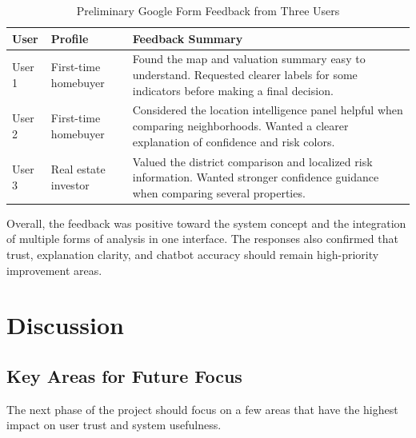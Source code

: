 \begin{table}[htbp]
    \centering
    \renewcommand{\arraystretch}{1.25}
    \begin{tabularx}{\textwidth}{>{\raggedright\arraybackslash}p{}>{\raggedright\arraybackslash}p{}>{\raggedright\arraybackslash}X}
        \toprule
        \rowcolor[gray]{0.9} \textbf{User} & \textbf{Profile} & \textbf{Feedback Summary} \\
        \midrule
        User 1 & First-time homebuyer & Found the map and valuation summary easy to understand. Requested clearer labels for some indicators before making a final decision. \\
        User 2 & First-time homebuyer & Considered the location intelligence panel helpful when comparing neighborhoods. Wanted a clearer explanation of confidence and risk colors. \\
        User 3 & Real estate investor & Valued the district comparison and localized risk information. Wanted stronger confidence guidance when comparing several properties. \\
        \bottomrule
    \end{tabularx}
    \caption{Preliminary Google Form Feedback from Three Users}
    \label{tab:chapter8-user-feedback}
\end{table}

Overall, the feedback was positive toward the system concept and the integration of multiple forms of analysis in one interface. The responses also confirmed that trust, explanation clarity, and chatbot accuracy should remain high-priority improvement areas.

\section{Discussion}

\subsection{Key Areas for Future Focus}
The next phase of the project should focus on a few areas that have the highest impact on user trust and system usefulness.

